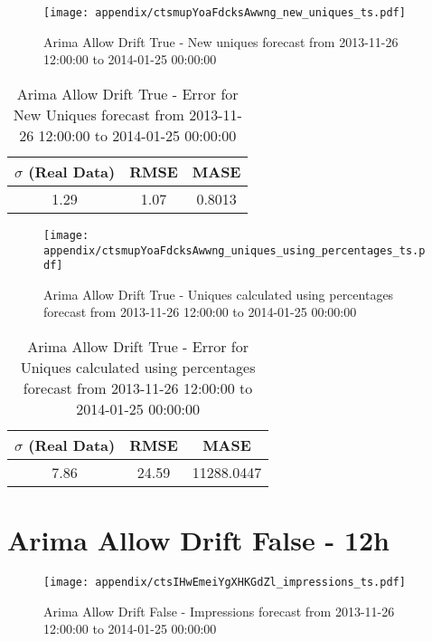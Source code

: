\begin{figure}[H] \begin{center} \leavevmode
\texttt{[image: appendix/ctsmupYoaFdcksAwwng\_new\_uniques\_ts.pdf]} \caption{
Arima Allow Drift True - New uniques forecast from 2013-11-26 12:00:00 to 2014-01-25 00:00:00} \label{fig:appendix/ctsmupYoaFdcksAwwng_new_uniques_ts.pdf} \end{center}
\end{figure}

\begin{table}[H]
\centering
\footnotesize
\begin{tabular}{ccc}
$\sigma$ (Real Data) & RMSE & MASE   \\ \hline
1.29 & 1.07 & 0.8013 \\
\end{tabular}

\vspace{0.5cm}

\caption{
Arima Allow Drift True - Error for New Uniques forecast from 2013-11-26 12:00:00 to 2014-01-25 00:00:00}
\end{table}

\begin{figure}[H] \begin{center} \leavevmode
\texttt{[image: appendix/ctsmupYoaFdcksAwwng\_uniques\_using\_percentages\_ts.pdf]} \caption{
Arima Allow Drift True - Uniques calculated using percentages forecast from 2013-11-26 12:00:00 to 2014-01-25 00:00:00} \label{fig:appendix/ctsmupYoaFdcksAwwng_uniques_using_percentages_ts.pdf} \end{center}
\end{figure}

\begin{table}[H]
\centering
\footnotesize
\begin{tabular}{ccc}
$\sigma$ (Real Data) & RMSE & MASE   \\ \hline
7.86 & 24.59 & 11288.0447 \\
\end{tabular}

\vspace{0.5cm}

\caption{
Arima Allow Drift True - Error for Uniques calculated using percentages forecast from 2013-11-26 12:00:00 to 2014-01-25 00:00:00}
\end{table}

\section{Arima Allow Drift False - 12h}
\begin{figure}[H] \begin{center} \leavevmode
\texttt{[image: appendix/ctsIHwEmeiYgXHKGdZl\_impressions\_ts.pdf]} \caption{
Arima Allow Drift False - Impressions forecast from 2013-11-26 12:00:00 to 2014-01-25 00:00:00} \label{fig:appendix/ctsIHwEmeiYgXHKGdZl_impressions_ts.pdf} \end{center}
\end{figure}


